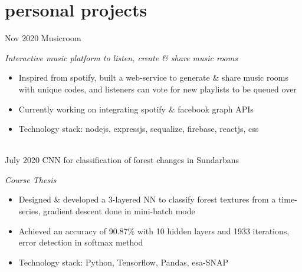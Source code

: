 \section{personal projects}
\begin{entrylist}
	\entry
	{Nov 2020}
	{Musicroom}
	{}
	{\emph{Interactive music platform to listen, create \& share music rooms}
		\begin{itemize}
			\item Inspired from spotify, built a web-service to generate \& share music rooms with unique codes, and listeners can vote for new playlists to be queued over
			\item Currently working on integrating spotify \& facebook graph APIs
			\item Technology stack: nodejs, expressjs, sequalize, firebase, reactjs, css
		\end{itemize}
	}
	\ \\
	\entry
	{July 2020}
	{CNN for classification of forest changes in Sundarbans}
	{}
	{\emph{Course Thesis}
		\begin{itemize}
			\item Designed \& developed a 3-layered NN to classify forest textures from a time-series, gradient descent done in mini-batch mode
			\item Achieved an accuracy of 90.87\% with 10 hidden layers and 1933 iterations, error detection in softmax method
			\item Technology stack: Python, Tensorflow, Pandas, esa-SNAP
		\end{itemize}
	}

\end{entrylist}